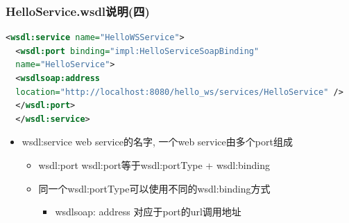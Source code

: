 \documentclass[CJKutf8,compress,hyperref]{beamer}
\begin{document}
\begin{CJK}{UTF8}{song}
  \begin{frame}[containsverbatim] 
  \frametitle{HelloService.wsdl说明(四)} 
  \begin{lstlisting}[language=XML]
  <wsdl:service name="HelloWSService">
  <wsdl:port binding="impl:HelloServiceSoapBinding"
  name="HelloService">
  <wsdlsoap:address
  location="http://localhost:8080/hello_ws/services/HelloService" />
  </wsdl:port>
  </wsdl:service>
  \end{lstlisting}
  \begin{itemize}
          \item {\color{red}wsdl:service} web service的名字, 一个web service由多个port组成
                  \begin{itemize}
                          \item {\color{red}wsdl:port} wsdl:port等于wsdl:portType + wsdl:binding
                          \item 同一个wsdl:portType可以使用不同的wsdl:binding方式
                                  \begin{itemize}
                                          \item {\color{red}wsdlsoap: address} 对应于port的url调用地址
                                  \end{itemize}
                  \end{itemize}
  \end{itemize}
  \end{frame}


\end{CJK}
\end{document}
